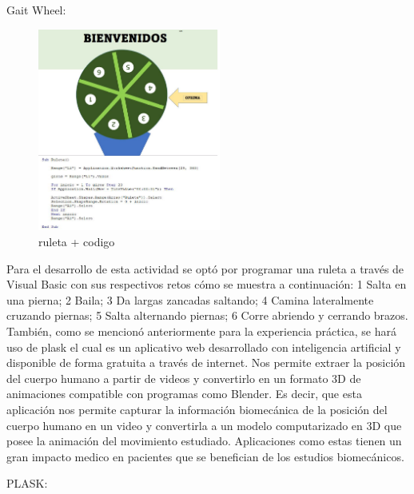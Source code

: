 \documentclass[journal,transmag]{IEEEtran}
\begin{document}
Gait Wheel:

  \begin{figure}[!h]
			\center
			\includegraphics[width=6cm]{ruleta.png}
			\caption{ruleta + codigo}
			\label{4}
			\end{figure}
Para el desarrollo de esta actividad se optó por programar una ruleta a través de Visual Basic con sus respectivos retos cómo se muestra a continuación:
1 Salta en una pierna; 2 Baila; 3 Da largas zancadas saltando; 4 Camina lateralmente cruzando piernas; 5 Salta alternando piernas; 6 Corre abriendo y cerrando brazos.
También, como se mencionó anteriormente para la experiencia práctica, se hará uso de plask el cual es un aplicativo web desarrollado con inteligencia artificial y disponible de forma gratuita a través de internet. Nos permite extraer la posición del cuerpo humano a partir de videos y convertirlo en un formato 3D de animaciones compatible con programas como Blender. Es decir, que esta aplicación nos permite capturar la información biomecánica de la posición del cuerpo humano en un video y convertirla a un modelo computarizado en 3D que posee la animación del movimiento estudiado. Aplicaciones como estas tienen un gran impacto medico en pacientes que se benefician de los estudios biomecánicos.


PLASK: 
\end{document}
